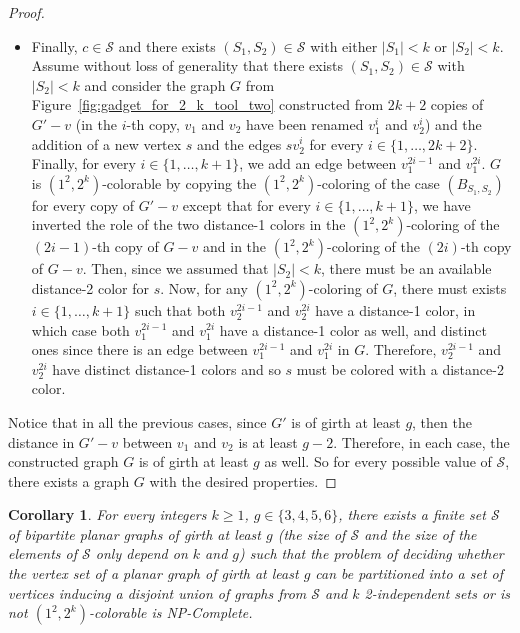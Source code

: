\documentclass{article}
\newtheorem{corollary}[theorem]{Corollary}
\newcommand{\colo}[2]{(1^{#1}, 2^{#2})}
\begin{document}
\begin{proof}
\begin{itemize}
        $\mathcal{S} = \{[1, \dots, k] \times [1, \dots, k]\}$ case, by adding the path $v_1v_1'sv_2'v_2$ with $v_1'$, $s$ and $v_2'$ being new vertices, and $s$ must be colored with a distance-$2$ color.
        \item Finally, $c \in \mathcal{S}$ and there exists $(S_1, S_2) \in \mathcal{S}$ with either $|S_1| < k$ or $|S_2| < k$. Assume without loss of generality that there exists $(S_1, S_2) \in \mathcal{S}$ with $|S_2| < k$ and consider the graph $G$ from Figure~\ref{fig:gadget_for_2_k_tool_two} constructed from $2k + 2$ copies of $G' - v$ (in the $i$-th copy, $v_1$ and $v_2$ have been renamed $v_1^i$ and $v_2^i$) and the addition of a new vertex $s$ and the edges $sv_2^i$ for every $i \in \{1, \dots, 2k + 2\}$. Finally, for every $i \in \{1, \dots, k + 1\}$, we add an edge between $v_1^{2i- 1}$ and $v_1^{2i}$. $G$ is $\colo{2}{k}$-colorable by copying the $\colo{2}{k}$-coloring of the case $(B_{S_1, S_2})$ for every copy of $G' - v$ except that for every $i \in \{1, \dots, k + 1\}$, we have inverted the role of the two distance-1 colors in the $\colo{2}{k}$-coloring of the $(2i - 1)$-th copy of $G - v$ and in the $\colo{2}{k}$-coloring of the $(2i)$-th copy of $G - v$. Then, since we assumed that $|S_2| < k$, there must be an available distance-2 color for $s$. Now, for any $\colo{2}{k}$-coloring of $G$, there must exists $i \in \{1, \dots, k + 1\}$ such that both $v_2^{2i - 1}$ and $v_2^{2i}$ have a distance-1 color, in which case both $v_1^{2i - 1}$ and $v_1^{2i}$ have a distance-1 color as well, and distinct ones since there is an edge between $v_1^{2i - 1}$ and $v_1^{2i}$ in $G$. Therefore, $v_2^{2i - 1}$ and $v_2^{2i}$ have distinct distance-1 colors and so $s$ must be colored with a distance-2 color.
    \end{itemize}
Notice that in all the previous cases, since $G'$ is of girth at least $g$, then the distance in $G' - v$ between $v_1$ and $v_2$ is at least $g - 2$. Therefore, in each case, the constructed graph $G$ is of girth at least $g$ as well. So for every possible value of $\mathcal{S}$, there exists a graph $G$ with the desired properties.
\end{proof}

\begin{corollary}\label{coro:2k_np_hard_gorth_3456}
For every integers $k \geq 1$, $g \in  \{3, 4, 5, 6\}$, there exists a finite set $\mathcal{S}$ of bipartite planar graphs of girth at least $g$ (the size of $\mathcal{S}$ and the size of the elements of $\mathcal{S}$ only depend on $k$ and $g$) such that the problem of deciding whether the vertex set of a planar graph of girth at least $g$ can be partitioned into a set of vertices inducing a disjoint union of graphs from $\mathcal{S}$ and $k$ 2-independent sets or is not $\colo{2}{k}$-colorable is NP-Complete.
\end{corollary}
\end{document}
